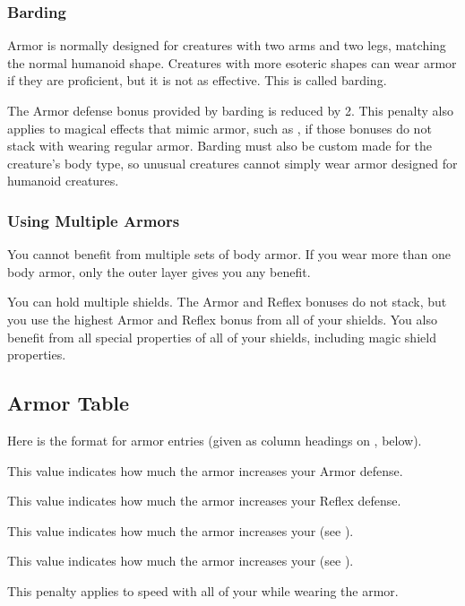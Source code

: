     \subsubsection{Barding}\label{Barding}
      Armor is normally designed for creatures with two arms and two legs, matching the normal humanoid shape.
      Creatures with more esoteric shapes can wear armor if they are proficient, but it is not as effective.
      This is called barding.

      The Armor defense bonus provided by barding is reduced by 2.
      This penalty also applies to magical effects that mimic armor, such as , if those bonuses do not stack with wearing regular armor.
      Barding must also be custom made for the creature's body type, so unusual creatures cannot simply wear armor designed for humanoid creatures.

    \subsubsection{Using Multiple Armors}
      You cannot benefit from multiple sets of body armor.
      If you wear more than one body armor, only the outer layer gives you any benefit.

      You can hold multiple shields.
      The Armor and Reflex bonuses do not stack, but you use the highest Armor and Reflex bonus from all of your shields.
      You also benefit from all special properties of all of your shields, including magic shield properties.

  \subsection{Armor Table}
    \par Here is the format for armor entries (given as column headings on , below).

     This value indicates how much the armor increases your Armor defense.

     This value indicates how much the armor increases your Reflex defense.

     This value indicates how much the armor increases your  (see ).

     This value indicates how much the armor increases your  (see ).

     This penalty applies to speed with all of your  while wearing the armor.

